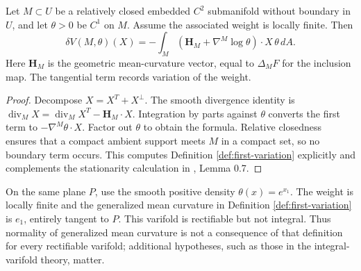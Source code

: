 \begin{proposition}\label{prop:weighted-smooth-first-variation}
Let $M\subset U$ be a relatively closed embedded $C^2$ submanifold without boundary in $U$, and let $\theta>0$ be $C^1$ on $M$. Assume the associated weight is locally finite. Then
\[
 \delta V(M,\theta)(X)
 =-\int_M(\mathbf H_M+\nabla^M\log\theta)\cdot X\,\theta\,dA.
\]
Here $\mathbf H_M$ is the geometric mean-curvature vector, equal to $\Delta_M F$ for the inclusion map. The tangential term records variation of the weight.
\end{proposition}
\begin{proof}
Decompose $X=X^T+X^\perp$. The smooth divergence identity is
$\operatorname{div}_M X=\operatorname{div}_M X^T-\mathbf H_M\cdot X$. Integration by parts against $\theta$ converts the first term to $-\nabla^M\theta\cdot X$. Factor out $\theta$ to obtain the formula. Relative closedness ensures that a compact ambient support meets $M$ in a compact set, so no boundary term occurs. This computes Definition \ref{def:first-variation} explicitly and complements the stationarity calculation in \cite{Minter}, Lemma 0.7.
\end{proof}

\begin{example}\label{ex:weighted-plane-mean-curvature}
On the same plane $P$, use the smooth positive density $\theta(x)=e^{x_1}$. The weight is locally finite and the generalized mean curvature in Definition \ref{def:first-variation} is $e_1$, entirely tangent to $P$. This varifold is rectifiable but not integral. Thus normality of generalized mean curvature is not a consequence of that definition for every rectifiable varifold; additional hypotheses, such as those in the integral-varifold theory, matter.
\end{example}
